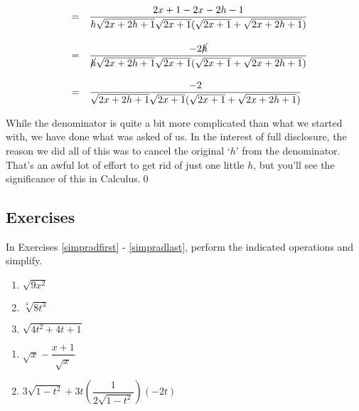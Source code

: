 \documentclass[10pt]{article}
\begin{document}
\begin{ex}
\[\begin{array}{rcl}
& = & \dfrac{2x+1 -2x-2h-1}{h\sqrt{2x+2h+1} \sqrt{2x+1}(\sqrt{2x+1} + \sqrt{2x+2h+1})} \\[20pt]

& = & \dfrac{-2\cancel{h}}{\cancel{h}\sqrt{2x+2h+1} \sqrt{2x+1}(\sqrt{2x+1} + \sqrt{2x+2h+1})} \\[20pt]
& = & \dfrac{-2}{\sqrt{2x+2h+1} \sqrt{2x+1}(\sqrt{2x+1} + \sqrt{2x+2h+1})} \\
\end{array}\] 

While the denominator is quite a bit more complicated than what we started with, we have done what was asked of us.  In the interest of full disclosure, the reason we did all of this was to cancel the original `$h$' from the denominator. That's an awful lot of effort to get rid of just one little $h$, but you'll see the significance of this in Calculus.\qed

\end{ex}

\newpage

\subsection{Exercises}

In Exercises \ref{simpradfirst} - \ref{simpradlast}, perform the indicated operations and simplify.

\begin{multicols}{3}
\begin{enumerate}

\item   $\sqrt{9x^2}$ \label{simpradfirst}

\item   $\sqrt[3]{8t^3}$

\item   $\sqrt{4t^2 + 4t + 1}$


\setcounter{HW}{\value{enumi}}
\end{enumerate}
\end{multicols}



\begin{multicols}{2}
\begin{enumerate}
\setcounter{enumi}{\value{HW}}

\item  $\sqrt{x} - \dfrac{x+1}{\sqrt{x}}$

\item  $3 \sqrt{1-t^2} + 3t\left(\dfrac{1}{2 \sqrt{1-t^2}}\right)(-2t)$

\setcounter{HW}{\value{enumi}}
\end{enumerate}
\end{multicols}
\end{document}
